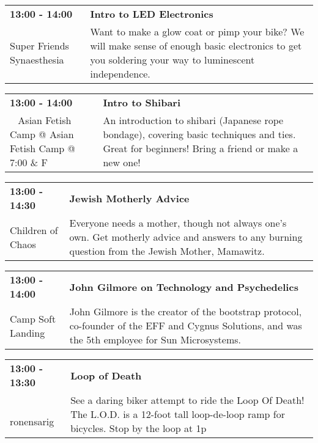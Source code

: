 \begin{tabular}{ p{1in} p{2.2in} }
    \textbf{13:00 - 14:00} & \textbf{Intro to LED Electronics} \\
    Super Friends Synaesthesia \newline  & Want to make a glow coat or pimp your bike? We will make sense of enough basic electronics to get you soldering your way to luminescent independence. \\
    \hline 
\end{tabular}
    
\begin{tabular}{ p{1in} p{2.2in} }
    \textbf{13:00 - 14:00} & \textbf{Intro to Shibari} \\
    ~ \newline Asian Fetish Camp @ Asian Fetish Camp @ 7:00 \& F & An introduction to shibari (Japanese rope bondage), covering basic techniques and ties. Great for beginners! Bring a friend or make a new one! \\
    \hline 
\end{tabular}
    
\begin{tabular}{ p{1in} p{2.2in} }
    \textbf{13:00 - 14:30} & \textbf{Jewish Motherly Advice} \\
    Children of Chaos \newline  & Everyone needs a mother, though not always one's own.  Get motherly advice and answers to any burning question from the Jewish Mother, Mamawitz. \\
    \hline 
\end{tabular}
    
\begin{tabular}{ p{1in} p{2.2in} }
    \textbf{13:00 - 14:00} & \textbf{John Gilmore on Technology and Psychedelics} \\
    Camp Soft Landing \newline  & John Gilmore is the creator of the bootstrap protocol, co-founder of the EFF and Cygnus Solutions, and was the 5th employee for Sun Microsystems. \\
    \hline 
\end{tabular}
    
\begin{tabular}{ p{1in} p{2.2in} }
    \textbf{13:00 - 13:30} & \textbf{Loop of Death} \\
    ~ \newline ronensarig & See a daring biker attempt to ride the Loop Of Death! The L.O.D. is a 12-foot tall loop-de-loop ramp for bicycles. Stop by the loop at 1p \\
    \hline 
\end{tabular}
    
